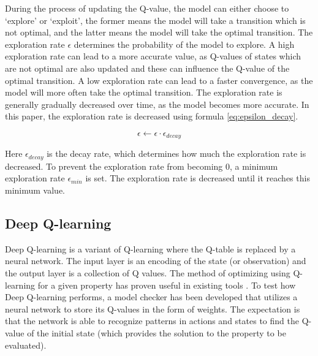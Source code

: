 During the process of updating the Q-value, the model can either choose to `explore' or `exploit', the former means the model will take a transition which is not optimal, and the latter means the model will take the optimal transition. The exploration rate $\epsilon$ determines the probability of the model to explore. A high exploration rate can lead to a more accurate value, as Q-values of states which are not optimal are also updated and these can influence the Q-value of the optimal transition. A low exploration rate can lead to a faster convergence, as the model will more often take the optimal transition. The exploration rate is generally gradually decreased over time, as the model becomes more accurate. In this paper, the exploration rate is decreased using formula \ref{eq:epsilon_decay}.

\begin{equation}\label{eq:epsilon_decay}
    \epsilon \leftarrow \epsilon \cdot \epsilon_{decay}
\end{equation}

Here $\epsilon_{decay}$ is the decay rate, which determines how much the exploration rate is decreased. To prevent the exploration rate from becoming $0$, a minimum exploration rate $\epsilon_{min}$ is set. The exploration rate is decreased until it reaches this minimum value.

\subsection{Deep Q-learning}

Deep Q-learning is a variant of Q-learning where the Q-table is replaced by a neural network. The input layer is an encoding of the state (or observation) and the output layer is a collection of Q values. The method of optimizing using Q-learning for a given property has proven useful in existing tools \cite{modest}. To test how Deep Q-learning performs, a model checker has been developed that utilizes a neural network to store its Q-values in the form of weights. The expectation is that the network is able to recognize patterns in actions and states to find the Q-value of the initial state (which provides the solution to the property to be evaluated).